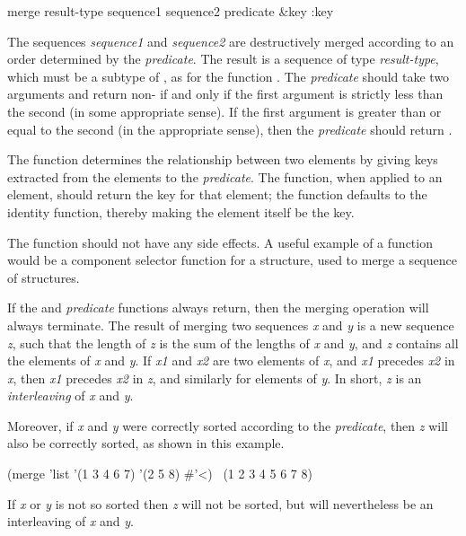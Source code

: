 \begin{defun}[Function]
merge result-type sequence1 sequence2 predicate &key :key

The sequences \emph{sequence1} and \emph{sequence2} are destructively
merged according to an order determined by
the \emph{predicate}.  The result is a sequence of type \emph{result-type},
which must be a subtype of , as for the function .
The \emph{predicate} should take two
arguments and return non-{\false} if and only if the first argument is
strictly less than the second (in some appropriate sense). 
If the first argument is greater than or equal to the second
(in the appropriate sense), then the \emph{predicate} should return {\false}.

The  function determines the relationship between two elements
by giving keys extracted from the elements to the \emph{predicate}.
The  function, when applied to an element, should return
the key for that element; the  function defaults to the identity
function, thereby making the element itself be the key.

The  function should not have any side effects.
A useful example of a  function would be a component
selector function for a  structure, used to merge
a sequence of structures.

If the  and \emph{predicate} functions always return, then the
merging operation will always terminate.
The result of merging two sequences \emph{x} and \emph{y} is a new sequence
\emph{z}, such that the length of \emph{z} is the sum of the lengths of \emph{x}
and \emph{y}, and \emph{z} contains all the elements of \emph{x} and \emph{y}.
If \emph{x1} and \emph{x2} are two elements of \emph{x}, and \emph{x1} precedes
\emph{x2} in \emph{x}, then \emph{x1} precedes \emph{x2} in \emph{z}, and similarly for
elements of \emph{y}.  In short, \emph{z} is an \emph{interleaving} of \emph{x}
 and \emph{y}.

Moreover, if \emph{x} and \emph{y} were correctly sorted according to the
\emph{predicate}, then \emph{z} will also be correctly sorted,
as shown in this example.
\begin{lisp}
(merge 'list '(1 3 4 6 7) '(2 5 8) \#'<) \EV\ (1 2 3 4 5 6 7 8)
\end{lisp}
If \emph{x} or \emph{y} is not so sorted then \emph{z} will not be sorted,
but will nevertheless be an interleaving of \emph{x} and \emph{y}.


\end{defun}
